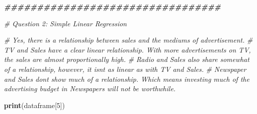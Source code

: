 \documentclass[
]{article}
\newenvironment{Shaded}{\begin{snugshade}}{\end{snugshade}}
\newcommand{\CommentTok}[1]{\textcolor[rgb]{0.56,0.35,0.01}{\textit{#1}}}
\newcommand{\DecValTok}[1]{\textcolor[rgb]{0.00,0.00,0.81}{#1}}
\newcommand{\DocumentationTok}[1]{\textcolor[rgb]{0.56,0.35,0.01}{\textbf{\textit{#1}}}}
\newcommand{\FunctionTok}[1]{\textcolor[rgb]{0.13,0.29,0.53}{\textbf{#1}}}
\newcommand{\NormalTok}[1]{#1}
\begin{document}
\begin{Shaded}
\begin{Highlighting}[]
\DocumentationTok{\#\#\#\#\#\#\#\#\#\#\#\#\#\#\#\#\#\#\#\#\#\#\#\#\#\#\#\#\#\#\#\#\#}

\CommentTok{\# Question 2: Simple Linear Regression}

\CommentTok{\# Yes, there is a relationship between sales and the mediums of advertisement. }
\CommentTok{\# TV and Sales have a clear linear relationship. With more advertisements on TV, the sales are almost proportionally high.}
\CommentTok{\# Radio and Sales also share somewhat of a relationship, however, it isn\textquotesingle{}t as linear as with TV and Sales. }
\CommentTok{\# Newspaper and Sales don\textquotesingle{}t show much of a relationship. Which means investing much of the advertising budget in Newspapers will not be worthwhile.}

\FunctionTok{print}\NormalTok{(dataframe[}\DecValTok{5}\NormalTok{])}
\end{Highlighting}
\end{Shaded}
\end{document}
